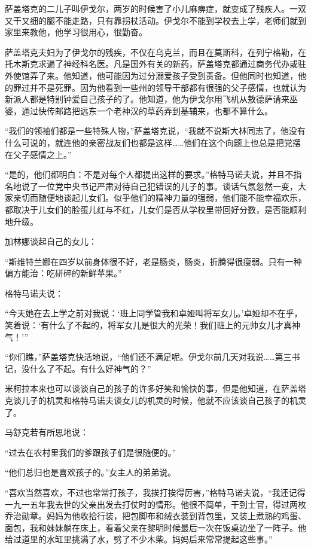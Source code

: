 萨盖塔克的二儿子叫伊戈尔，两岁的时候害了小儿麻痹症，就变成了残疾人。一双又干又细的腿不能走路，只有靠拐杖活动。伊戈尔不能到学校去上学，老师们就到家里来教他，他学习很用心，很勤奋。

萨盖塔克夫妇为了伊戈尔的残疾，不仅在乌克兰，而且在莫斯科，在列宁格勒，在托木斯克求遍了神经科名医。凡是国外有关的新药，萨盖塔克都通过商务代办或驻外使馆弄了来。他知道，他可能因为过分溺爱孩子受到责备。但他同时也知道，他的罪过并不是死罪。因为他看到一些州的领导干部都有很强的父子感情，也就认为新派人都是特别钟爱自己孩子的了。他知道，他为伊戈尔用飞机从敖德萨请来巫婆，通过快传邮路把远东一个老神汉的草药弄到基辅来，也都不算什么。

“我们的领袖们都是一些特殊人物，”萨盖塔克说，“我就不说斯大林同志了，他没有什么可说的，就连他的亲密战友们也都是这样……他们在这个向题上也总是把党摆在父子感情之上。”

“是的，他们都明白：不是对每个人都提出这样的要求。”格特马诺夫说，并且不指名地说了一位党中央书记严肃对待自己犯错误的儿子的事。谈话气氛忽然一变，大家亲切而随便地谈起儿女们。似乎他们的精神力量的强弱，他们能不能幸福欢乐，都取决于儿女们的脸蛋儿红与不红，儿女们是否从学校里带回好分数，是否能顺利地升级。

加林娜谈起自己的女儿：

“斯维特兰娜在四岁以前身体很不好，老是肠炎，肠炎，折腾得很瘦弱。只有一种偏方能治：吃研碎的新鲜苹果。”

格特马诺夫说：

“今天她在去上学之前对我说：‘班上同学管我和卓娅叫将军女儿。’卓娅却不在乎，笑着说：‘有什么了不起的，将军女儿是很大的光荣！我们班上的元帅女儿才真神气！’”

“你们瞧，”萨盖塔克快活地说，“他们还不满足呢。伊戈尔前几天对我说……第三书记，没什么了不起。有什么好神气的？”

米柯拉本来也可以谈谈自己的孩子的许多好笑和愉快的事，但是他知道，在萨盖塔克谈儿子的机灵和格特马诺夫谈女儿的机灵的时候，他就不应该谈自己孩子的机灵了。

马舒克若有所思地说：

“过去在农村里我们的爹跟孩子们是很随便的。”

“他们总归也是喜欢孩子的。”女主人的弟弟说。

“喜欢当然喜欢，不过也常常打孩子，我挨打挨得厉害，”格特马诺夫说，“我还记得一九一五年我去世的父亲出发去打仗时的情形。他很不简单，干到士官，得过两枚乔治勋章。妈妈为他收拾行装，把包脚布和绒衣装到背包里，又装上煮熟的鸡蛋、面包，我和妹妹躺在床上，看着父亲在黎明时候最后一次在饭桌边坐了一阵子。他给过道里的水缸里挑满了水，劈了不少木柴。妈妈后来常常提起这些事。”

